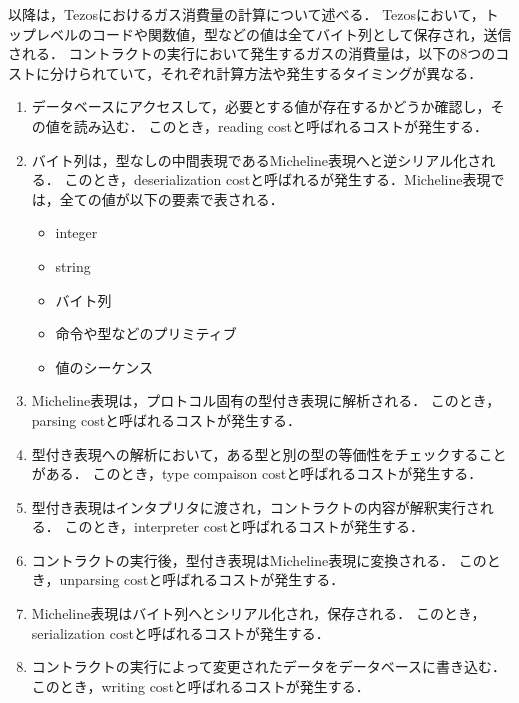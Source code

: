 \documentclass{kuisthesis}
\begin{document}
以降は，Tezosにおけるガス消費量の計算について述べる．
Tezosにおいて，トップレベルのコードや関数値，型などの値は全てバイト列として保存され，送信される．
コントラクトの実行において発生するガスの消費量は，以下の8つのコストに分けられていて，それぞれ計算方法や発生するタイミングが異なる．

\begin{enumerate}
  \item データベースにアクセスして，必要とする値が存在するかどうか確認し，その値を読み込む．
  このとき，reading costと呼ばれるコストが発生する．
  \item バイト列は，型なしの中間表現であるMicheline表現へと逆シリアル化される．
  このとき，deserialization costと呼ばれるが発生する．Micheline表現では，全ての値が以下の要素で表される．
  \begin{itemize}
    \item integer
    \item string
    \item バイト列
    \item 命令や型などのプリミティブ
    \item 値のシーケンス
  \end{itemize}
  \item Micheline表現は，プロトコル固有の型付き表現に解析される．
  このとき，parsing costと呼ばれるコストが発生する．
  \item 型付き表現への解析において，ある型と別の型の等価性をチェックすることがある．
  このとき，type compaison costと呼ばれるコストが発生する．
  \item 型付き表現はインタプリタに渡され，コントラクトの内容が解釈実行される．
  このとき，interpreter costと呼ばれるコストが発生する．
  \item コントラクトの実行後，型付き表現はMicheline表現に変換される．
  このとき，unparsing costと呼ばれるコストが発生する．
  \item Micheline表現はバイト列へとシリアル化され，保存される．
  このとき，serialization costと呼ばれるコストが発生する．
  \item コントラクトの実行によって変更されたデータをデータベースに書き込む．
  このとき，writing costと呼ばれるコストが発生する．
\end{enumerate}
\end{document}

